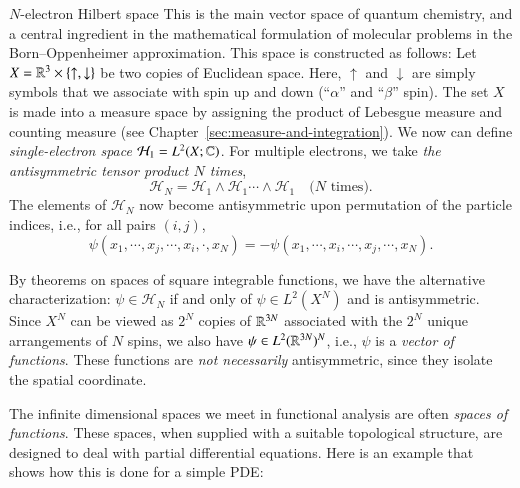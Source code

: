 \begin{myExample}{$N$-electron Hilbert space}{}
    This is the main vector space of quantum chemistry, and a central ingredient in the mathematical formulation of molecular problems in the Born--Oppenheimer approximation. This space is constructed as follows: Let $X = \mathbb{R}^3 \times \{\uparrow, \downarrow\}$ be two copies of Euclidean space. Here, $\uparrow$ and $\downarrow$ are simply symbols that we associate with spin up and down (``$\alpha$'' and ``$\beta$'' spin). The set $X$ is made into a measure space by assigning the product of Lebesgue measure and counting measure (see Chapter~\ref{sec:measure-and-integration}). We now can define \emph{single-electron space} $\mathcal{H}_1 = L^2(X;\mathbb{C})$. For multiple electrons, we take \emph{the antisymmetric tensor product $N$ times},
    \begin{equation}
        \mathcal{H}_N = \mathcal{H}_1 \wedge \mathcal{H}_1 \cdots \wedge \mathcal{H}_1 \quad \text{($N$ times)}.
    \end{equation}
    The elements of $\mathcal{H}_N$ now become antisymmetric upon permutation of the particle indices, i.e., for all pairs $(i,j)$, 
    \[ \psi(x_1,\cdots, x_j, \cdots, x_i, \cdot ,x_N) = - \psi(x_1, \cdots, x_i, \cdots, x_j, \cdots, x_N). \]
    
    By theorems on spaces of square integrable functions, we have the alternative characterization: $\psi \in \mathcal{H}_N$ if and only of $\psi \in L^2(X^N)$ and is antisymmetric. Since $X^N$ can be viewed as $2^N$ copies of $\mathbb{R}^{3N}$ associated with the $2^N$ unique arrangements of $N$ spins, we also have $\psi \in L^2(\mathbb{R}^{3N})^N$, i.e., $\psi$ is a \emph{vector of functions}. These functions are \emph{not necessarily} antisymmetric, since they isolate the spatial coordinate.
\end{myExample}

The infinite dimensional spaces we meet in functional analysis are often \emph{spaces of functions}. These spaces, when supplied with a suitable topological structure, are designed to deal with partial differential equations. Here is an example that shows how this is done for a simple PDE:

